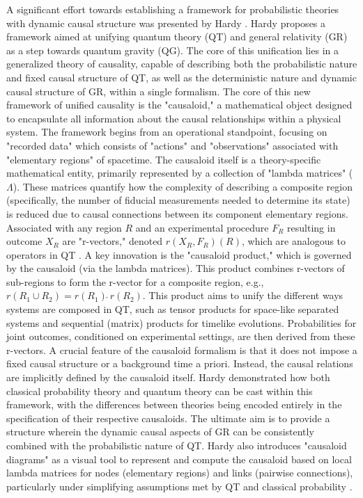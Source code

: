 {A significant effort towards establishing a framework for probabilistic theories with dynamic causal structure was presented by Hardy \cite{hardy2005probability}. Hardy proposes a framework aimed at unifying quantum theory (QT) and general relativity (GR) as a step towards quantum gravity (QG). The core of this unification lies in a generalized theory of causality, capable of describing both the probabilistic nature and fixed causal structure of QT, as well as the deterministic nature and dynamic causal structure of GR, within a single formalism. The core of this new framework of unified causality is the "causaloid," a mathematical object designed to encapsulate all information about the causal relationships within a physical system.
The framework begins from an operational standpoint, focusing on "recorded data" which consists of "actions" and "observations" associated with "elementary regions" of spacetime.
The causaloid itself is a theory-specific mathematical entity, primarily represented by a collection of "lambda matrices" ($\Lambda$). These matrices quantify how the complexity of describing a composite region (specifically, the number of fiducial measurements needed to determine its state) is reduced due to causal connections between its component elementary regions. Associated with any region $R$ and an experimental procedure $F_R$ resulting in outcome $X_R$ are "r-vectors," denoted $r(X_R, F_R)(R)$, which are analogous to operators in QT \cite{hardy2005probability}. A key innovation is the "causaloid product," which is governed by the causaloid (via the lambda matrices). This product combines r-vectors of sub-regions to form the r-vector for a composite region, e.g., $r(R_1 \cup R_2) = r(R_1) \hat{\;} r(R_2)$. This product aims to unify the different ways systems are composed in QT, such as tensor products for space-like separated systems and sequential (matrix) products for timelike evolutions. Probabilities for joint outcomes, conditioned on experimental settings, are then derived from these r-vectors. A crucial feature of the causaloid formalism is that it does not impose a fixed causal structure or a background time a priori. Instead, the causal relations are implicitly defined by the causaloid itself. Hardy demonstrated how both classical probability theory and quantum theory can be cast within this framework, with the differences between theories being encoded entirely in the specification of their respective causaloids. The ultimate aim is to provide a structure wherein the dynamic causal aspects of GR can be consistently combined with the probabilistic nature of QT. Hardy also introduces "causaloid diagrams" as a visual tool to represent and compute the causaloid based on local lambda matrices for nodes (elementary regions) and links (pairwise connections), particularly under simplifying assumptions met by QT and classical probability \cite{hardy2005probability}.

}
